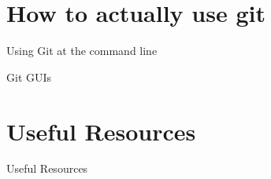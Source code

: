 \documentclass{beamer}
\begin{document}

\section{How to actually use git} %
\label{sec:how_to_actually_use_git}
\begin{frame}{Using Git at the command line}
	
\end{frame}

\begin{frame}{Git GUIs}
	
\end{frame}

\section{Useful Resources} %
\label{sec:useful_resources}
\begin{frame}{Useful Resources}
	 
\end{frame}
\end{document}
